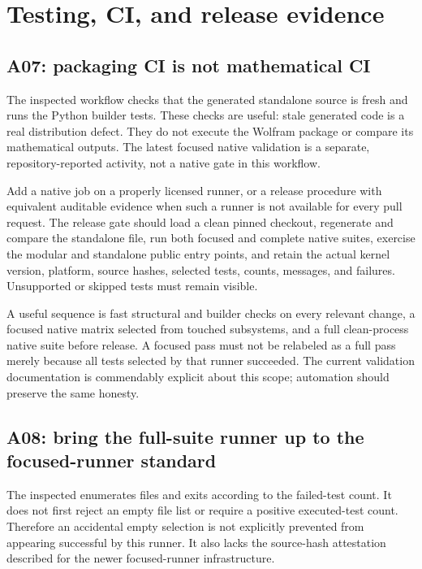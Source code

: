 \documentclass[11pt,a4paper]{article}
\newcommand{\code}[1]{\texttt{\detokenize{#1}}}
\begin{document}
\section{Testing, CI, and release evidence}
\label{sec:testing}
\subsection{A07: packaging CI is not mathematical CI}
The inspected \code{standalone.yml} workflow checks that the generated
standalone source is fresh and runs the Python builder tests. These checks
are useful: stale generated code is a real distribution defect. They do
not execute the Wolfram package or compare its mathematical outputs.
The latest focused native validation is a separate, repository-reported
activity, not a native gate in this workflow.
\cite{ci,validation}

Add a native job on a properly licensed runner, or a release procedure with
equivalent auditable evidence when such a runner is not available for every
pull request. The release gate should load a clean pinned checkout,
regenerate and compare the standalone file, run both focused and complete
native suites, exercise the modular and standalone public entry points,
and retain the actual kernel version, platform, source hashes, selected
tests, counts, messages, and failures. Unsupported or skipped tests must
remain visible.

A useful sequence is fast structural and builder checks on every relevant
change, a focused native matrix selected from touched subsystems, and a
full clean-process native suite before release. A focused pass must not be
relabeled as a full pass merely because all tests selected by that runner
succeeded. The current validation documentation is commendably explicit
about this scope; automation should preserve the same honesty.

\subsection{A08: bring the full-suite runner up to the focused-runner standard}
The inspected \code{Tests/RunTests.wl} enumerates \code{*.wlt} files and
exits according to the failed-test count. It does not first reject an empty
file list or require a positive executed-test count. Therefore an accidental
empty selection is not explicitly prevented from appearing successful by
this runner. It also lacks the source-hash attestation described for the
newer focused-runner infrastructure.
\cite{runtests,validation}
\end{document}
